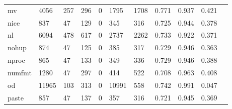 \begin{longtable}{lp{1.10cm}p{1.10cm}p{1.10cm}p{1.10cm}p{1.10cm}p{1.10cm}p{1.10cm}p{1.10cm}p{1.10cm}p{1.10cm}}
mv        &                   4056 &                                257 &                               296 &                                0 &                              1795 &                            1708 &                             0.771 &                                 0.937 &                               0.421 \\
nice      &                    837 &                                 47 &                               129 &                                0 &                               345 &                             316 &                             0.725 &                                 0.944 &                               0.378 \\
nl        &                   6094 &                                478 &                               617 &                                0 &                              2737 &                            2262 &                             0.733 &                                 0.922 &                               0.371 \\
nohup     &                    874 &                                 47 &                               125 &                                0 &                               385 &                             317 &                             0.729 &                                 0.946 &                               0.363 \\
nproc     &                    865 &                                 47 &                               133 &                                0 &                               349 &                             336 &                             0.729 &                                 0.946 &                               0.388 \\
numfmt    &                   1280 &                                 47 &                               297 &                                0 &                               414 &                             522 &                             0.708 &                                 0.963 &                               0.408 \\
od        &                  11965 &                                103 &                               313 &                                0 &                             10991 &                             558 &                             0.742 &                                 0.991 &                               0.047 \\
paste     &                    857 &                                 47 &                               137 &                                0 &                               357 &                             316 &                             0.721 &                                 0.945 &                               0.369 \\

\end{longtable}
